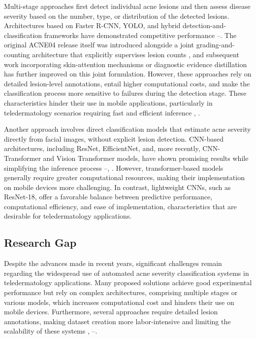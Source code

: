 \documentclass[conference]{IEEEtran}
\begin{document}
Multi-stage approaches first detect individual acne lesions and then assess disease severity based on the number, type, or distribution of the detected lesions. Architectures based on Faster R-CNN, YOLO, and hybrid detection-and-classification frameworks have demonstrated competitive performance \cite{b13}–\cite{b17}. The original ACNE04 release itself was introduced alongside a joint grading-and-counting architecture that explicitly supervises lesion counts \cite{b30}, and subsequent work incorporating skin-attention mechanisms \cite{b32} or diagnostic evidence distillation \cite{b18} has further improved on this joint formulation. However, these approaches rely on detailed lesion-level annotations, entail higher computational costs, and make the classification process more sensitive to failures during the detection stage. These characteristics hinder their use in mobile applications, particularly in teledermatology scenarios requiring fast and efficient inference \cite{b11}, \cite{b12}.

Another approach involves direct classification models that estimate acne severity directly from facial images, without explicit lesion detection. CNN-based architectures, including ResNet, EfficientNet, and, more recently, CNN-Transformer and Vision Transformer models, have shown promising results while simplifying the inference process \cite{b15}–\cite{b18}, \cite{b21}. However, transformer-based models generally require greater computational resources, making their implementation on mobile devices more challenging. In contrast, lightweight CNNs, such as ResNet-18, offer a favorable balance between predictive performance, computational efficiency, and ease of implementation, characteristics that are desirable for teledermatology applications.



\subsection{Research Gap}
Despite the advances made in recent years, significant challenges remain regarding the widespread use of automated acne severity classification systems in teledermatology applications. Many proposed solutions achieve good experimental performance but rely on complex architectures, comprising multiple stages or various models, which increases computational cost and hinders their use on mobile devices. Furthermore, several approaches require detailed lesion annotations, making dataset creation more labor-intensive and limiting the scalability of these systems \cite{b14}, \cite{b19}–\cite{b21}.
\end{document}
